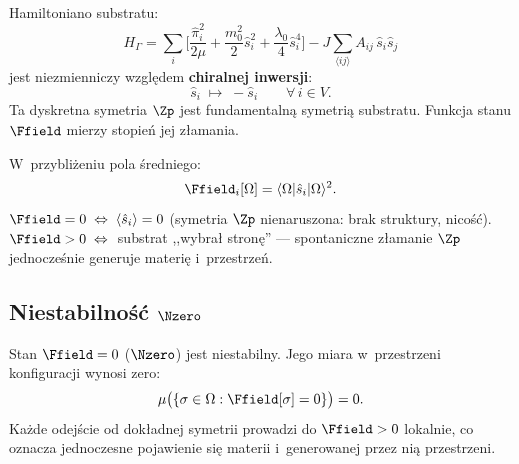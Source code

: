 \begin{proposition}\label{prop:Z2}
Hamiltoniano substratu:
\begin{equation}\label{eq:H-Gamma}
    H_\Gamma = \sum_i \biggl[
      \frac{\hat{\pi}_i^2}{2\mu}
    + \frac{m_0^2}{2}\hat{s}_i^2
    + \frac{\lambda_0}{4}\hat{s}_i^4
    \biggr]
    - J\!\sum_{\langle ij\rangle} A_{ij}\,\hat{s}_i\hat{s}_j
\end{equation}
jest niezmienniczy wzgl\k{e}dem \textbf{chiralnej inwersji}:
\begin{equation}\label{eq:Z2-chiral}
    \hat{s}_i \;\mapsto\; -\hat{s}_i
    \qquad \forall\, i \in V.
\end{equation}
Ta dyskretna symetria $\Zp$ jest fundamentaln\k{a}
symetri\k{a} substratu. Funkcja stanu $\Ffield$ mierzy
stopie\'n jej z\l{}amania.
\end{proposition}

\begin{corollary}\label{cor:F-s}
W~przybli\.zeniu pola \'sredniego:
\begin{equation}\label{eq:F-s-relation}
    \Ffield_i[\Omega]
    = \langle\Omega|\hat{s}_i|\Omega\rangle^2.
\end{equation}
$\Ffield = 0 \;\Leftrightarrow\;
\langle\hat{s}_i\rangle = 0$
(symetria $\Zp$ nienaruszona: brak struktury,
nico\'s\'c). $\Ffield > 0 \;\Leftrightarrow\;$
substrat ,,wybra\l{} stron\k{e}'' --- spontaniczne
z\l{}amanie $\Zp$ jednocze\'snie generuje materi\k{e}
i~przestrze\'n.
\end{corollary}

\subsection{Niestabilno\'s\'c $\Nzero$}\label{ssec:niestabilnosc}

\begin{axiom}\label{ax:P3}
Stan $\Ffield = 0$ ($\Nzero$) jest niestabilny. Jego miara
w~przestrzeni konfiguracji wynosi zero:
\begin{equation}
    \mu\bigl(\{\sigma \in \Omega : \Ffield[\sigma] = 0\}\bigr) = 0.
\end{equation}
Ka\.zde odej\'scie od dok\l{}adnej symetrii prowadzi do $\Ffield > 0$
lokalnie, co oznacza jednoczesne pojawienie si\k{e} materii
i~generowanej przez ni\k{a} przestrzeni.
\end{axiom}

